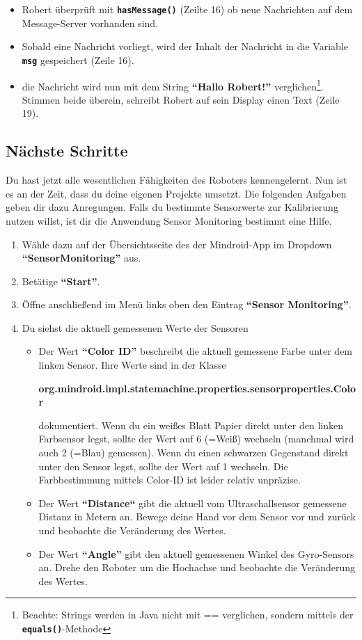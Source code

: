 \documentclass[
	12pt,
	colorbacktitle,
	accentcolor=tud1c,
	draft,
	twoside,
	german
]{tudexercise}
\newcommand{\solpath}[0]{../../impl/androidApp/app/src/main/java/org/mindroid/android/app/programs/workshop/solutions}
\newcommand{\bfcode}[1]{\texttt{\textbf{#1}}}
\begin{document}
	
	
	\begin{itemize}
	\item Robert überprüft mit \bfcode{hasMessage()} (Zeilte 16) ob neue Nachrichten auf dem Message-Server vorhanden sind. 
	\item Sobald eine Nachricht vorliegt, wird der Inhalt der Nachricht in die Variable \bfcode{msg} gespeichert (Zeile 16).
	\item die Nachricht wird nun mit dem String \textbf{``Hallo Robert!''} verglichen\footnote{Beachte: Strings werden in Java nicht mit == verglichen, sondern mittels der \bfcode{equals()}-Methode}. Stimmen beide überein, schreibt Robert auf sein Display einen Text (Zeile 19).
	\end{itemize}
	
	\subsection{Nächste Schritte}
	Du hast jetzt alle wesentlichen Fähigkeiten des Roboters kennengelernt. Nun ist es an der Zeit, dass du deine eigenen Projekte umsetzt. Die folgenden Aufgaben geben dir dazu Anregungen.
	Falls du bestimmte Sensorwerte zur Kalibrierung nutzen willst, ist dir die Anwendung Sensor Monitoring bestimmt eine Hilfe.
	\begin{enumerate}
	\item Wähle dazu auf der Übersichtsseite des der Mindroid-App im Dropdown \textbf{“SensorMonitoring” }aus.
	\item Betätige \textbf{“Start”}.
	\item Öffne anschließend im Menü links oben den Eintrag \textbf{“Sensor Monitoring”}.
	\item Du siehst die aktuell gemessenen Werte der Sensoren
	\begin{itemize}
	
	\item Der Wert \textbf{“Color ID” }beschreibt die aktuell gemessene Farbe unter dem linken Sensor. Ihre Werte sind in der Klasse \begin{center} \textbf{org.mindroid.impl.statemachine.properties.sensorproperties.Color} 
	\end{center}dokumentiert. Wenn du ein weißes Blatt Papier direkt unter den linken Farbsensor legst, sollte der Wert auf 6 (=Weiß) wechseln (manchmal wird auch 2 (=Blau) gemessen). Wenn du einen schwarzen Gegenstand direkt unter den Sensor legst, sollte der Wert auf 1 wechseln. Die Farbbestimmung mittels Color-ID ist leider relativ unpräzise.
	\item Der Wert \textbf{“Distance“} gibt die aktuell vom Ultraschallsensor gemessene Distanz in Metern an. Bewege deine Hand vor dem Sensor vor und zurück und beobachte die Veränderung des Wertes.
	\item Der Wert \textbf{“Angle” }gibt den aktuell gemessenen Winkel des Gyro-Sensors an. Drehe den Roboter um die Hochachse und beobachte die Veränderung des Wertes.
	\end{itemize}
	\end{enumerate}
\end{document}
